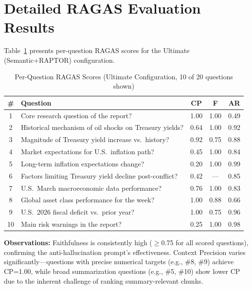 \documentclass[11pt, a4paper]{article}
\begin{document}

\newpage
\appendix
\section{Detailed RAGAS Evaluation Results}

Table~\ref{tab:ragas_full} presents per-question RAGAS scores for the Ultimate (Semantic+RAPTOR) configuration.

\begin{table}[h!]
    \centering
    \footnotesize
    \begin{tabularx}{\textwidth}{|c|X|c|c|c|}
        \hline
        \# & \textbf{Question} & \textbf{CP} & \textbf{F} & \textbf{AR} \\
        \hline
        1 & Core research question of the report? & 1.00 & 1.00 & 0.49 \\
        2 & Historical mechanism of oil shocks on Treasury yields? & 0.64 & 1.00 & 0.92 \\
        3 & Magnitude of Treasury yield increase vs.\ history? & 0.92 & 0.75 & 0.88 \\
        4 & Market expectations for U.S.\ inflation path? & 0.45 & 1.00 & 0.84 \\
        5 & Long-term inflation expectations change? & 0.20 & 1.00 & 0.99 \\
        6 & Factors limiting Treasury yield decline post-conflict? & 0.42 & --- & 0.85 \\
        7 & U.S.\ March macroeconomic data performance? & 0.76 & 1.00 & 0.83 \\
        8 & Global asset class performance for the week? & 1.00 & 0.88 & 0.66 \\
        9 & U.S.\ 2026 fiscal deficit vs.\ prior year? & 1.00 & 0.75 & 0.96 \\
        10 & Main risk warnings in the report? & 0.25 & 1.00 & 0.98 \\
        \hline
    \end{tabularx}
    \caption{Per-Question RAGAS Scores (Ultimate Configuration, 10 of 20 questions shown)}
    \label{tab:ragas_full}
\end{table}

\noindent\textbf{Observations:} Faithfulness is consistently high ($\geq$0.75 for all scored questions), confirming the anti-hallucination prompt's effectiveness. Context Precision varies significantly---questions with precise numerical targets (e.g., \#8, \#9) achieve CP=1.00, while broad summarization questions (e.g., \#5, \#10) show lower CP due to the inherent challenge of ranking summary-relevant chunks.
\end{document}
